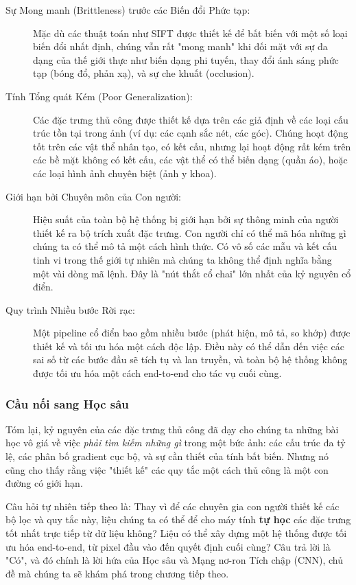 \begin{description}
    \item[Sự Mong manh (Brittleness) trước các Biến đổi Phức tạp:] Mặc dù các thuật toán như SIFT được thiết kế để bất biến với một số loại biến đổi nhất định, chúng vẫn rất "mong manh" khi đối mặt với sự đa dạng của thế giới thực như biến dạng phi tuyến, thay đổi ánh sáng phức tạp (bóng đổ, phản xạ), và sự che khuất (occlusion).
    
    \item[Tính Tổng quát Kém (Poor Generalization):] Các đặc trưng thủ công được thiết kế dựa trên các giả định về các loại cấu trúc tồn tại trong ảnh (ví dụ: các cạnh sắc nét, các góc). Chúng hoạt động tốt trên các vật thể nhân tạo, có kết cấu, nhưng lại hoạt động rất kém trên các bề mặt không có kết cấu, các vật thể có thể biến dạng (quần áo), hoặc các loại hình ảnh chuyên biệt (ảnh y khoa).
    
    \item[Giới hạn bởi Chuyên môn của Con người:] Hiệu suất của toàn bộ hệ thống bị giới hạn bởi sự thông minh của người thiết kế ra bộ trích xuất đặc trưng. Con người chỉ có thể mã hóa những gì chúng ta có thể mô tả một cách hình thức. Có vô số các mẫu và kết cấu tinh vi trong thế giới tự nhiên mà chúng ta không thể định nghĩa bằng một vài dòng mã lệnh. Đây là "nút thắt cổ chai" lớn nhất của kỷ nguyên cổ điển.
    
    \item[Quy trình Nhiều bước Rời rạc:] Một pipeline cổ điển bao gồm nhiều bước (phát hiện, mô tả, so khớp) được thiết kế và tối ưu hóa một cách độc lập. Điều này có thể dẫn đến việc các sai số từ các bước đầu sẽ tích tụ và lan truyền, và toàn bộ hệ thống không được tối ưu hóa một cách end-to-end cho tác vụ cuối cùng.
\end{description}

\subsubsection{Cầu nối sang Học sâu}
\label{subsubsubsec:handcrafted_bridge_to_dl}
Tóm lại, kỷ nguyên của các đặc trưng thủ công đã dạy cho chúng ta những bài học vô giá về việc \textit{phải tìm kiếm những gì} trong một bức ảnh: các cấu trúc đa tỷ lệ, các phân bố gradient cục bộ, và sự cần thiết của tính bất biến. Nhưng nó cũng cho thấy rằng việc "thiết kế" các quy tắc một cách thủ công là một con đường có giới hạn.

Câu hỏi tự nhiên tiếp theo là: Thay vì để các chuyên gia con người thiết kế các bộ lọc và quy tắc này, liệu chúng ta có thể để cho máy tính \textbf{tự học} các đặc trưng tốt nhất trực tiếp từ dữ liệu không? Liệu có thể xây dựng một hệ thống được tối ưu hóa end-to-end, từ pixel đầu vào đến quyết định cuối cùng? Câu trả lời là "Có", và đó chính là lời hứa của Học sâu và Mạng nơ-ron Tích chập (CNN), chủ đề mà chúng ta sẽ khám phá trong chương tiếp theo.

